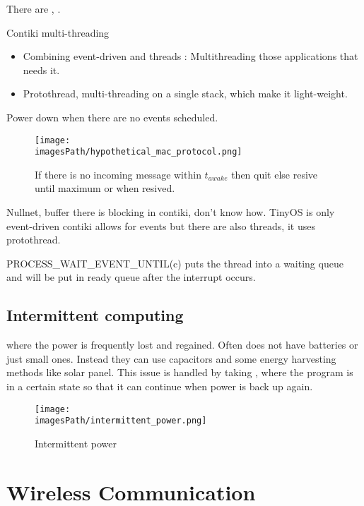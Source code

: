 There are , . 

Contiki multi-threading 
\begin{itemize}
    \item Combining event-driven and threads : Multithreading those applications that needs it.
    \item Protothread, multi-threading on a single stack, which make it light-weight.
\end{itemize}

Power down when there are no events scheduled.

\begin{figure}[H]
    \centering
    \texttt{[image: \\imagesPath/hypothetical\_mac\_protocol.png]}
    \caption{If there is no incoming message within $t_{awake}$ then quit else resive until maximum or when resived. }
    \label{fig:Hypothetical MAC Protocol}
\end{figure}

Nullnet, buffer there is blocking in contiki, don't know how.
TinyOS is only event-driven contiki allows for events but there are also threads, it uses protothread.

PROCESS\_WAIT\_EVENT\_UNTIL(c) puts the thread into a waiting queue
and will be put in ready queue after the interrupt occurs.


\subsection{Intermittent computing}
 where the power is frequently lost and regained.
Often does not have batteries or just small ones. Instead they can use capacitors and some energy harvesting methods like solar panel.
This issue is handled by taking , where the program is in a certain state so that it can continue when power is back up again.

\begin{figure}[H]
    \centering
    \texttt{[image: \\imagesPath/intermittent\_power.png]}
    \caption{Intermittent power}
    \label{fig:intermittent_power}
\end{figure}


\section{Wireless Communication}

